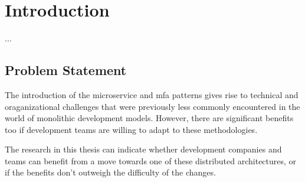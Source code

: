 
\chapter{Introduction}
\label{ch:introduction}




... %

\section{Problem Statement}
\label{sec:problem-statement}


The introduction of the \gls{microservice} and \gls{mfa} patterns gives rise to
technical and oraganizational challenges that were previously less commonly
encountered in the world of \gls{monolithic} development models. However, there
are significant benefits too if development teams are willing to adapt to these
methodologies. 

The research in this thesis can indicate whether development companies and teams
can benefit from a move towards one of these distributed architectures, or if
the benefits don't outweigh the difficulty of the changes.

